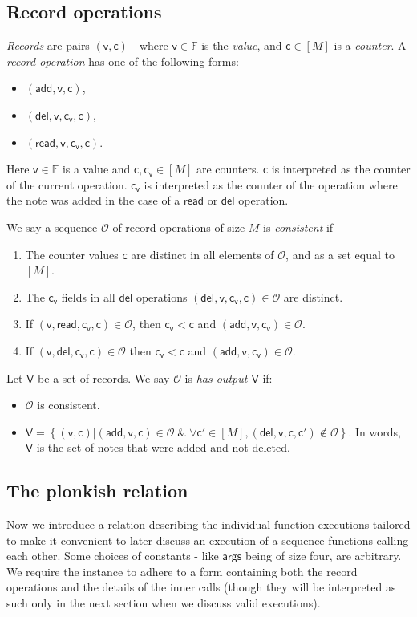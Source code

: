 \documentclass[11pt]{article} %
\newcommand{\F}{\ensuremath{\mathbb F}\xspace}
\newcommand{\set}[1]{\ensuremath{\left\{#1\right\}}\xspace}
\renewcommand{\c}{\ensuremath{\mathsf{c}}\xspace}
\newcommand{\vc}{\ensuremath{\mathsf{c_v}}\xspace}
\renewcommand{\v}{\ensuremath{\mathsf{v}}\xspace}
\newcommand{\add}{\ensuremath{\mathsf{add}}\xspace}
\newcommand{\del}{\ensuremath{\mathsf{del}}\xspace}
\renewcommand{\read}{\ensuremath{\mathsf{read}}\xspace}
\newcommand{\countrange}{\ensuremath{[M]}\xspace}
\newcommand{\ops}{\ensuremath{\mathcal{O}}\xspace}
\newcommand{\args}{\ensuremath{\mathsf{args}}\xspace}
\newcommand{\recset}{\ensuremath{\mathsf{V}}\xspace}
\begin{document}
\subsection{Record operations}
\emph{Records} are pairs $(\v,\c)$ - where $\v\in \F$ is the \emph{value}, and $\c\in \countrange$ is a \emph{counter}.
A \emph{record operation} has one of the following forms:
\begin{itemize}
 \item $(\add,\v,\c)$,
\item $(\del,\v,\vc,\c)$,
\item $(\read,\v,\vc,\c)$.

\end{itemize}
Here $\v\in \F$ is a value and $\c,\vc \in \countrange$ are counters.
$\c$ is interpreted as the counter of the current operation. $\vc$
  is interpreted as the counter of the operation where
the note was added in the case of a \read or \del operation.



We say a sequence \ops of record operations of size $M$ is \emph{consistent} if 
\begin{enumerate}
\item The counter values $\c$ are distinct in all elements of \ops, and as a set equal to \countrange.
\item The $\vc$ fields in all $\del$ operations $(\del,\v,\vc,\c)\in \ops$ are distinct.
\item If $(\v,\read,\vc,\c)\in \ops$, then $\vc<\c$ and $(\add, \v,\vc)\in \ops$.
\item If $(\v,\del,\vc,\c)\in \ops$ then $\vc<\c$ and $(\add,\v,\vc)\in \ops$.
\end{enumerate}

Let \recset be a set of records.
We say $\ops$ is \emph{has output \recset} if:
\begin{itemize}
 \item $\ops$ is consistent.
 \item $\recset=\set{(\v,\c) | (\add,\v,\c)\in \ops\;\&\; \forall \c'\in \countrange,(\del,\v,\c,\c')\notin \ops }$. In words,
 \recset is the set of notes that were added and not deleted.
\end{itemize}



\subsection{The plonkish relation}
Now we introduce a relation describing the individual function executions tailored to make it convenient to later discuss an execution of a  sequence functions calling each other.
Some choices of constants - like \args being of size four, are arbitrary.
We require the instance to adhere to a form containing both the record operations and the details of the inner calls (though they will be interpreted as such only in the next section when we discuss valid executions).
\end{document}
